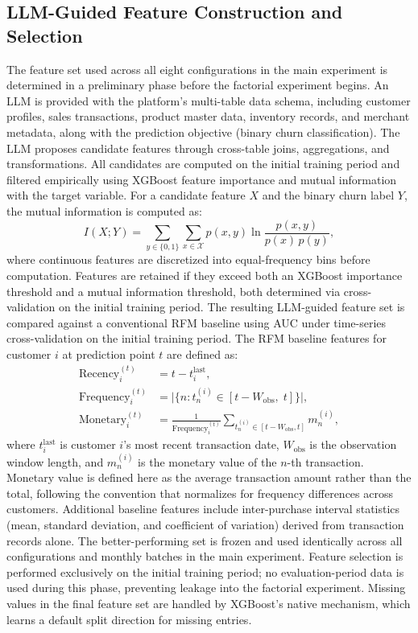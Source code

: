 \subsection{LLM-Guided Feature Construction and Selection}

The feature set used across all eight configurations in the main experiment is determined in a preliminary phase before the factorial experiment begins. An LLM is provided with the platform's multi-table data schema, including customer profiles, sales transactions, product master data, inventory records, and merchant metadata, along with the prediction objective (binary churn classification). The LLM proposes candidate features through cross-table joins, aggregations, and transformations. All candidates are computed on the initial training period and filtered empirically using XGBoost feature importance and mutual information with the target variable. For a candidate feature $X$ and the binary churn label $Y$, the mutual information is computed as:
\begin{equation}
  I(X; Y) = \sum_{y \in \{0,1\}} \sum_{x \in \mathcal{X}} p(x, y) \ln \frac{p(x, y)}{p(x)\, p(y)},
  \label{eq:mutual-info}
\end{equation}
where continuous features are discretized into equal-frequency bins before computation. Features are retained if they exceed both an XGBoost importance threshold and a mutual information threshold, both determined via cross-validation on the initial training period. The resulting LLM-guided feature set is compared against a conventional RFM baseline using AUC under time-series cross-validation on the initial training period. The RFM baseline features for customer $i$ at prediction point $t$ are defined as:
\begin{align}
  \text{Recency}_i^{(t)} &= t - t_i^{\text{last}}, \label{eq:recency} \\
  \text{Frequency}_i^{(t)} &= \bigl|\{n : t_n^{(i)} \in [t - W_{\text{obs}}, \; t]\}\bigr|, \label{eq:frequency} \\
  \text{Monetary}_i^{(t)} &= \frac{1}{\text{Frequency}_i^{(t)}} \sum_{t_n^{(i)} \in [t - W_{\text{obs}}, t]} m_n^{(i)}, \label{eq:monetary}
\end{align}
where $t_i^{\text{last}}$ is customer $i$'s most recent transaction date, $W_{\text{obs}}$ is the observation window length, and $m_n^{(i)}$ is the monetary value of the $n$-th transaction. Monetary value is defined here as the average transaction amount rather than the total, following the convention that normalizes for frequency differences across customers. Additional baseline features include inter-purchase interval statistics (mean, standard deviation, and coefficient of variation) derived from transaction records alone. The better-performing set is frozen and used identically across all configurations and monthly batches in the main experiment. Feature selection is performed exclusively on the initial training period; no evaluation-period data is used during this phase, preventing leakage into the factorial experiment. Missing values in the final feature set are handled by XGBoost's native mechanism, which learns a default split direction for missing entries.

